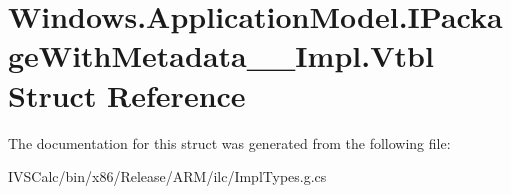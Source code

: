 \hypertarget{struct_windows_1_1_application_model_1_1_i_package_with_metadata_____impl_1_1_vtbl}{}\section{Windows.\+Application\+Model.\+I\+Package\+With\+Metadata\+\_\+\+\_\+\+Impl.\+Vtbl Struct Reference}
\label{struct_windows_1_1_application_model_1_1_i_package_with_metadata_____impl_1_1_vtbl}


The documentation for this struct was generated from the following file\+:\begin{DoxyCompactItemize}
\item 
I\+V\+S\+Calc/bin/x86/\+Release/\+A\+R\+M/ilc/Impl\+Types.\+g.\+cs\end{DoxyCompactItemize}
